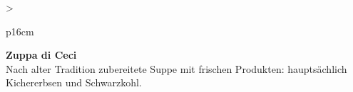 \documentclass[
  beamerpaper,
  DIV=11,
  numbers=noendperiod,
  aspectratio=54]{scrreprt}
\begin{document}
\begin{table}

\caption{\label{tbl-panel-ceci}Zuppa di
Ceci}\begin{minipage}[t]{\linewidth}

\tabularnewline

\fontsize{16}{18}\selectfont
\begin{tabular}{>{\raggedright\arraybackslash}p{16cm}}
\toprule
\begingroup\fontsize{18}{20}\selectfont \textbf{Zuppa di Ceci}\endgroup\\
\midrule
Nach alter Tradition zubereitete Suppe mit frischen Produkten: hauptsächlich Kichererbsen und Schwarzkohl.\\
\bottomrule
\end{tabular}

\end{minipage}%
\newline
\begin{minipage}[t]{\linewidth}


\end{minipage}%

\end{table}
\end{document}
